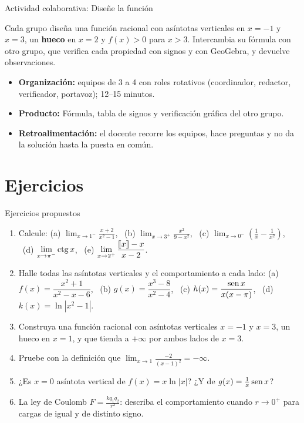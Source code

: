 \documentclass[10pt,aspectratio=169]{beamer}
\begin{document}
\begin{frame}{Actividad colaborativa: Diseñe la función}
  \small
  \begin{activa}
    Cada grupo diseña una función racional con asíntotas verticales en $x=-1$ y $x=3$, un \textbf{hueco} en $x=2$ y $f(x)>0$ para $x>3$. Intercambia su fórmula con otro grupo, que verifica cada propiedad con signos y con GeoGebra, y devuelve observaciones.
  \end{activa}
  \begin{itemize}
    \item \textbf{Organización:} equipos de 3 a 4 con roles rotativos (coordinador, redactor, verificador, portavoz); 12--15 minutos.
    \item \textbf{Producto:} Fórmula, tabla de signos y verificación gráfica del otro grupo.
    \item \textbf{Retroalimentación:} el docente recorre los equipos, hace preguntas y no da la solución hasta la puesta en común.
  \end{itemize}
\end{frame}

\section{Ejercicios}

\begin{frame}{Ejercicios propuestos}
  \small
  \begin{ejercicio}
    \begin{enumerate}
      \item Calcule: (a) $\displaystyle\lim_{x\to1^-}\frac{x+2}{x^2-1}$, \ (b) $\displaystyle\lim_{x\to3^+}\frac{x^2}{9-x^2}$, \ (c) $\displaystyle\lim_{x\to0^-}\left(\frac1x-\frac1{x^2}\right)$,
        \ (d) $\displaystyle\lim_{x\to\pi^-}\operatorname{ctg} x$, \ (e) $\displaystyle\lim_{x\to2^+}\frac{\left\llbracket x\right\rrbracket-x}{x-2}$.
      \item Halle todas las asíntotas verticales y el comportamiento a cada lado: (a) $f(x)=\dfrac{x^2+1}{x^2-x-6}$,
        \ (b) $g(x)=\dfrac{x^3-8}{x^2-4}$, \ (c) $h(x)=\dfrac{\operatorname{sen} x}{x(x-\pi)}$, \ (d) $k(x)=\ln|x^2-1|$.
      \item Construya una función racional con asíntotas verticales $x=-1$ y $x=3$, un hueco en $x=1$, y que tienda a $+\infty$ por ambos lados de $x=3$.
      \item Pruebe con la definición que $\displaystyle\lim_{x\to1}\frac{-2}{(x-1)^2}=-\infty$.
      \item ¿Es $x=0$ asíntota vertical de $f(x)=x\ln|x|$? ¿Y de $g(x)=\frac{1}{x}\operatorname{sen} x$?
      \item La ley de Coulomb $F=\frac{kq_1q_2}{r^2}$: describa el comportamiento cuando $r\to0^+$ para cargas de igual y de distinto signo.
    \end{enumerate}
  \end{ejercicio}
\end{frame}
\end{document}
